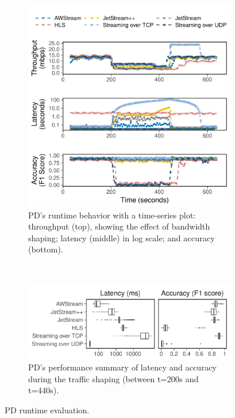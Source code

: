 \documentclass[twocolumn, 9pt]{article}
\begin{document}
\begin{figure}[t]
  \begin{subfigure}[t]{\columnwidth}
    \centering
    \includegraphics[width=\columnwidth]{figures/runtime_mot-timeseries.pdf}
    \caption{PD's runtime behavior with a time-series plot: throughput (top),
      showing the effect of bandwidth shaping; latency (middle) in log scale;
      and accuracy (bottom).}
    \label{fig:pd-runtime-timeseries}
  \end{subfigure}
  \vspace{1em}
  \\
  \begin{subfigure}[t]{\columnwidth}
    \centering
    \includegraphics[width=\columnwidth]{figures/runtime_mot-boxplot.pdf}
    \caption{PD's performance summary of latency and accuracy during the traffic
      shaping (between t=200s and t=440s).}
\label{fig:pd-runtime-boxplot}
  \end{subfigure}
  \caption{PD runtime evaluation.}
  \label{fig:pd-runtime}
\end{figure}
\end{document}
